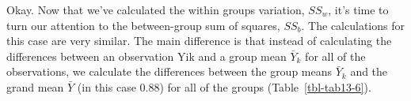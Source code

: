 \documentclass[
  a4paper,
]{book}
\begin{document}
Okay. Now that we've calculated the within groups variation, \(SS_w\),
it's time to turn our attention to the between-group sum of squares,
\(SS_b\). The calculations for this case are very similar. The main
difference is that instead of calculating the differences between an
observation Yik and a group mean \(\bar{Y}_k\) for all of the
observations, we calculate the differences between the group means
\(\bar{Y}_k\) and the grand mean \(\bar{Y}\) (in this case \(0.88\)) for
all of the groups (Table~\ref{tbl-tab13-6}).

\hypertarget{tbl-tab13-6}{}
 
  \providecommand{\huxb}[2]{\arrayrulecolor[RGB]{#1}\global\arrayrulewidth=#2pt}
  \providecommand{\huxvb}[2]{\color[RGB]{#1}\vrule width #2pt}
  \providecommand{\huxtpad}[1]{\rule{0pt}{#1}}
  \providecommand{\huxbpad}[1]{\rule[-#1]{0pt}{#1}}
\end{document}
